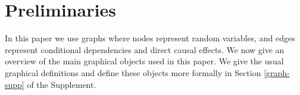 \documentclass[11pt,a4paper]{article}
\theoremstyle{definition}
\theoremstyle{remark}
\newcommand{\mpdag}{maximal PDAG}
\newcommand{\g}[1][G]{\mathcal{#1}}
\newcommand{\optb}[2][X,Y]{\mathbf{O}(\mathbf{#1},#2)}
\begin{document}
%










\section{Preliminaries}
\label{prelim}

In this paper we use graphs where nodes represent random variables, and edges represent conditional dependencies and direct causal effects. We now give an overview of the main graphical objects used in this paper. We give the usual graphical definitions and define these objects more formally in Section \ref{graph-supp} of the Supplement. 
\end{document}
